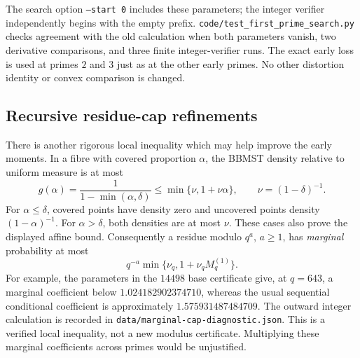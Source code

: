 \documentclass[11pt]{article}
\begin{document}
The search option \texttt{--start 0} includes these parameters; the
integer verifier independently begins with the empty prefix.
\texttt{code/test\_first\_prime\_search.py} checks agreement with the
old calculation when both parameters vanish, two derivative comparisons,
and three finite integer-verifier runs. The exact early loss is used at
primes $2$ and $3$ just as at the other early primes. No other distortion
identity or convex comparison is changed.

\subsection{Recursive residue-cap refinements}
There is another rigorous local inequality which may help improve the
early moments. In a fibre with covered proportion $\alpha$, the BBMST
density relative to uniform measure is at most
\[
 g(\alpha)=\frac1{1-\min(\alpha,\delta)}
 \leq\min\{\nu,1+\nu\alpha\},\qquad \nu=(1-\delta)^{-1}.
\]
For $\alpha\leq\delta$, covered points have density zero and uncovered
points density $(1-\alpha)^{-1}$. For $\alpha>\delta$, both densities
are at most $\nu$. These cases also prove the displayed affine bound.
Consequently a residue modulo $q^a$, $a\geq1$, has \emph{marginal}
probability at most
\[
 q^{-a}\min\{\nu_q,1+\nu_q M_q^{(1)}\}.
\]
For example, the parameters in the $14498$ base certificate give, at $q=643$,
a marginal coefficient below $1.024182902374710$, whereas the usual
sequential conditional coefficient is approximately $1.575931487484709$.
The outward integer calculation is recorded in
\texttt{data/marginal-cap-diagnostic.json}. This is a verified local
inequality, not a new modulus certificate. Multiplying these marginal
coefficients across primes would be unjustified.
\end{document}
